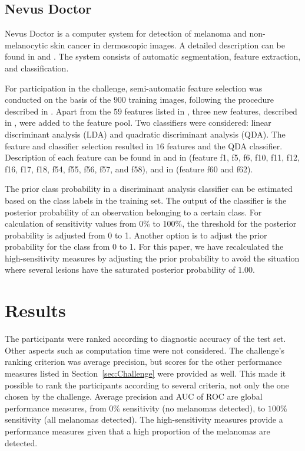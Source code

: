\documentclass[10pt,letterpaper]{article}
\begin{document}
\subsection*{Nevus Doctor} \label{sec:NevusDoctor}

Nevus Doctor is a computer system for detection of melanoma and non-melanocytic skin cancer in dermoscopic images. 
A detailed description can be found in \cite{Mollersen2015Improved} and \cite{Zortea2014Performance}. 
The system consists of automatic segmentation, feature extraction, and classification. 

For participation in the challenge, semi-automatic feature selection was conducted on the basis of the $900$ training images, following the procedure described in \cite{Mollersen2015Improved}. 
Apart from the $59$ features listed in \cite{Mollersen2015Improved}, three new features, described in \cite{Mollersen2015Divergencebased}, were added to the feature pool. 
Two classifiers were considered: linear discriminant analysis (LDA) and quadratic discriminant analysis (QDA). 
The feature and classifier selection resulted in $16$ features and the QDA classifier. 
Description of each feature can be found in \cite{Mollersen2015Improved} and in \cite{Zortea2014Performance} (feature f1, f5, f6, f10, f11, f12, f16, f17, f18, f54, f55, f56, f57, and f58), and in  \cite{Mollersen2015Divergencebased} (feature f60 and f62).

The prior class probability in a discriminant analysis classifier can be estimated based on the class labels in the training set. The output of the classifier is the posterior probability of an observation belonging to a certain class. For calculation of sensitivity values from 0\% to 100\%, the threshold for the posterior probability is adjusted from 0 to 1. Another option is to adjust the prior probability for the class from 0 to 1. 
For this paper, we have recalculated the high-sensitivity measures by adjusting the prior probability to avoid the situation where several lesions have the saturated posterior probability of $1.00$. 





\section*{Results} \label{sec:Results}
The participants were ranked according to diagnostic accuracy of the test set. 
Other aspects such as computation time were not considered.
The challenge's ranking criterion was average precision, but scores for the other performance measures listed in Section~\ref{sec:Challenge} were provided as well.  
This made it possible to rank the participants according to several criteria, not only the one chosen by the challenge. 
Average precision and AUC of ROC are global performance measures, from $0\%$ sensitivity (no melanomas detected), to $100\%$ sensitivity (all melanomas detected). 
The high-sensitivity measures provide a performance measures given that a high proportion of the melanomas are detected. 
\end{document}

